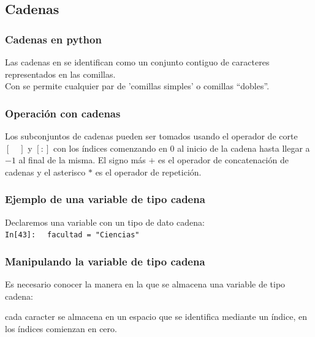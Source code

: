 \documentclass[12pt]{beamer}
\begin{document}
{\subsection{Cadenas}
\begin{frame}
\frametitle{Cadenas en python}
Las cadenas en \python{} se identifican como un conjunto contiguo de caracteres representados en las comillas.
\\
\bigskip
Con \python{} se permite cualquier par de 'comillas simples' o comillas \enquote{dobles}.
\end{frame}
\begin{frame}
\frametitle{Operación con cadenas}
Los subconjuntos de cadenas pueden ser tomados usando el operador de corte $[ \quad ]$ y $[:]$ con los índices comenzando en $0$ al inicio de la cadena hasta llegar a $-1$ al final de la misma.
\pause
El signo más $+$ es el operador de concatenación de cadenas y el asterisco $*$ es el operador de repetición.
\end{frame}
\begin{frame}[fragile]
\frametitle{Ejemplo de una variable de tipo cadena}
Declaremos una variable con un tipo de dato cadena:
\\
\bigskip
\textcolor{ao}{\texttt{In[43]: }} \verb| facultad = "Ciencias"|
\end{frame}
\begin{frame}
\frametitle{Manipulando la variable de tipo cadena}
Es necesario conocer la manera en la que se almacena una variable de tipo cadena:
\begin{figure}

\end{figure}
cada caracter se almacena en un espacio que se identifica mediante un índice, en \python{} los índices comienzan en cero.



\end{frame}}
\end{document}
